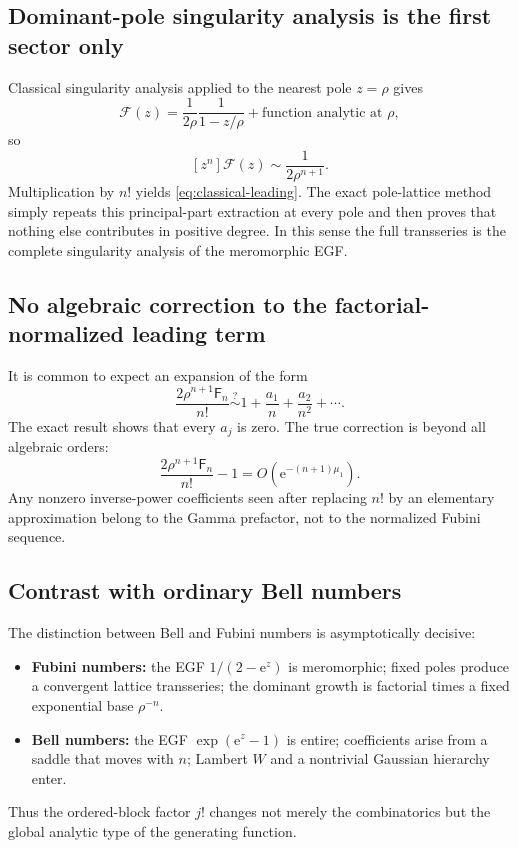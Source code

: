 \documentclass[11pt,oneside]{article}
\numberwithin{equation}{section}
\newcommand{\e}{\mathrm e}
\newcommand{\Fub}{\mathsf F}
\newcommand{\Coeff}[2]{[#1^{#2}]}
\begin{document}
\subsection{Dominant-pole singularity analysis is the first sector only}

Classical singularity analysis applied to the nearest pole \(z=\rho\) gives
\[
 \mathcal F(z)=\frac{1}{2\rho}\frac{1}{1-z/\rho}+\text{function analytic at }\rho,
\]
so
\[
 \Coeff{z}{n}\mathcal F(z)\sim\frac{1}{2\rho^{n+1}}.
\]
Multiplication by \(n!\) yields \cref{eq:classical-leading}.  The exact pole-lattice method simply repeats this principal-part extraction at every pole and then proves that nothing else contributes in positive degree.  In this sense the full transseries is the complete singularity analysis of the meromorphic EGF.

\subsection{No algebraic correction to the factorial-normalized leading term}

It is common to expect an expansion of the form
\[
 \frac{2\rho^{n+1}\Fub_n}{n!}
 \stackrel{?}{\sim}1+\frac{a_1}{n}+\frac{a_2}{n^2}+\cdots.
\]
The exact result shows that every \(a_j\) is zero.  The true correction is beyond all algebraic orders:
\begin{equation}
 \frac{2\rho^{n+1}\Fub_n}{n!}-1
 =O(\e^{-(n+1)\mu_1}).
 \label{eq:beyond-all-orders}
\end{equation}
Any nonzero inverse-power coefficients seen after replacing \(n!\) by an elementary approximation belong to the Gamma prefactor, not to the normalized Fubini sequence.

\subsection{Contrast with ordinary Bell numbers}

The distinction between Bell and Fubini numbers is asymptotically decisive:
\begin{itemize}
 \item \textbf{Fubini numbers:} the EGF \(1/(2-\e^z)\) is meromorphic; fixed poles produce a convergent lattice transseries; the dominant growth is factorial times a fixed exponential base \(\rho^{-n}\).
 \item \textbf{Bell numbers:} the EGF \(\exp(\e^z-1)\) is entire; coefficients arise from a saddle that moves with \(n\); Lambert \(W\) and a nontrivial Gaussian hierarchy enter.
\end{itemize}
Thus the ordered-block factor \(j!\) changes not merely the combinatorics but the global analytic type of the generating function.
\end{document}
